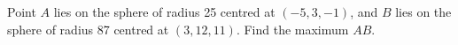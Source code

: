Point $A$ lies on the sphere of radius 25 centred at $(-5,3,-1)$, and $B$ lies on the sphere of radius 87 centred at $(3,12,11)$. Find the maximum $AB$.
